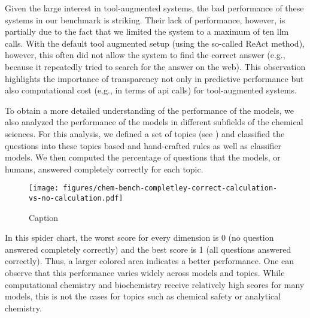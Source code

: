 \documentclass[11pt, oneside]{article}
\begin{document}
Given the large interest in tool-augmented systems, the bad performance of these systems in our benchmark is striking. 
Their lack of performance, however, is partially due to the fact that we limited the system to a maximum of ten \gls{llm} calls.
With the default tool augmented setup (using the so-called ReAct method), however, this often did not allow the system to find the correct answer (e.g., because it repeatedly tried to search for the answer on the web).
This observation highlights the importance of transparency not only in predictive performance but also computational cost (e.g., in terms of \gls{api} calls) for tool-augmented systems.


To obtain a more detailed understanding of the performance of the models, we also analyzed the performance of the models in different subfields of the chemical sciences.
For this analysis, we defined a set of topics (see ) and classified the questions into these topics based and hand-crafted rules as well as classifier models.
We then computed the percentage of questions that the models, or humans, answered completely correctly for each topic.

\begin{figure}
    \centering
    \texttt{[image: figures/chem-bench-completley-correct-calculation-vs-no-calculation.pdf]}
    \caption{Caption}
    \label{fig:performance_by_topic}
\end{figure}

In this spider chart, the worst score for every dimension is 0 (no question answered completely correctly) and the best score is 1 (all questions answered correctly). 
Thus, a larger colored area indicates a better performance. 
One can observe that this performance varies widely across models and topics. 
While computational chemistry and biochemistry receive relatively high scores for many models, this is not the cases for topics such as chemical safety or analytical chemistry.
\end{document}
